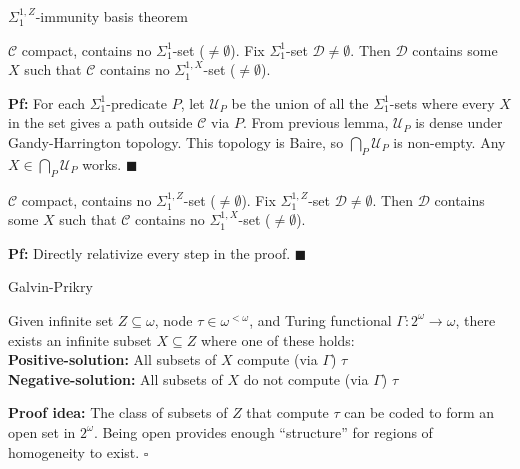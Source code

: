 \begin{frame}{$\Sigma_1^{1,Z}$-immunity basis theorem}
  \begin{thm*}
    $\mathcal{C}$ compact, contains no $\Sigma_1^{1}$-set
    ($\neq\emptyset$). Fix $\Sigma_1^{1}$-set
    $\mathcal{D}\neq\emptyset$. Then $\mathcal{D}$ contains some $X$ such
    that $\mathcal{C}$ contains no $\Sigma_1^{1,X}$-set ($\neq\emptyset$).
  \end{thm*}
  \textbf{Pf:} For each $\Sigma_1^{1}$-predicate $P$, let $\mathcal{U}_P$
  be the union of all the $\Sigma_1^{1}$-sets where every $X$ in the set
  gives a path outside $\mathcal{C}$ via $P$. From previous lemma,
  $\mathcal{U}_P$ is dense under Gandy-Harrington topology. This topology
  is Baire, so $\bigcap_P\mathcal{U}_P$ is non-empty. Any
  $X\in\bigcap_P\mathcal{U}_P$ works. $\blacksquare$

  \vspace{0.5em}
  \begin{coro*}
    $\mathcal{C}$ compact, contains no $\Sigma_1^{1,Z}$-set
    ($\neq\emptyset$). Fix $\Sigma_1^{1,Z}$-set
    $\mathcal{D}\neq\emptyset$. Then $\mathcal{D}$ contains some $X$ such
    that $\mathcal{C}$ contains no $\Sigma_1^{1,X}$-set ($\neq\emptyset$).
  \end{coro*}
  \textbf{Pf:} Directly relativize every step in the proof.
  $\blacksquare$
\end{frame}

\begin{frame}{Galvin-Prikry}
  \begin{fact*}
    Given infinite set $Z\subseteq\omega$, node $\tau\in\omega^{<\omega}$,
    and Turing functional $\Gamma:2^\omega\rightarrow\omega$, there exists
    an infinite subset $X\subseteq Z$ where one of these holds:\\

    \vspace{1em}
    \textbf{Positive-solution:} All subsets of $X$ compute (via $\Gamma$)
    $\tau$ \\
    \textbf{Negative-solution:} All subsets of $X$ do not compute (via
    $\Gamma$) $\tau$
  \end{fact*}

  \vspace{1em}
  \textbf{Proof idea:} The class of subsets of $Z$ that
  compute $\tau$ can be coded to form an open set in $2^\omega$. Being
  open provides enough ``structure'' for regions of homogeneity to exist.
  $\square$
\end{frame}

